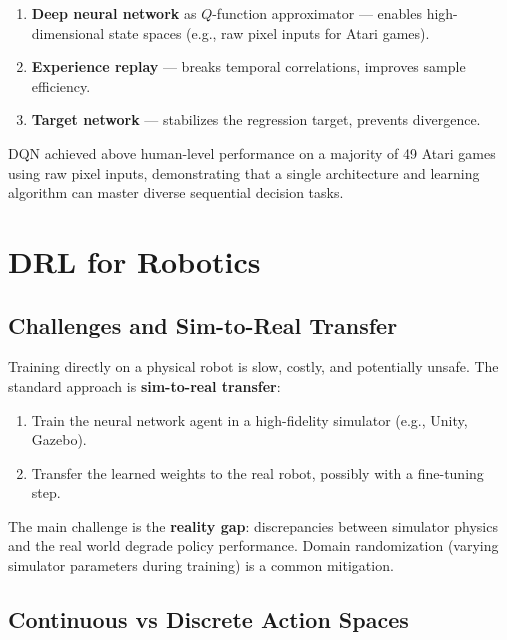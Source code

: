 \documentclass[11pt,a4paper]{article}
\theoremstyle{definition}
\theoremstyle{plain}
\theoremstyle{remark}
\begin{document}
\begin{tcolorbox}[colback=blue!5!white,colframe=blue!75!black,title=\textbf{DQN Key Innovations}]
\begin{enumerate}
    \item \textbf{Deep neural network} as $Q$-function approximator — enables high-dimensional state spaces (e.g., raw pixel inputs for Atari games).
    \item \textbf{Experience replay} — breaks temporal correlations, improves sample efficiency.
    \item \textbf{Target network} — stabilizes the regression target, prevents divergence.
\end{enumerate}
DQN achieved above human-level performance on a majority of 49 Atari games using raw pixel inputs, demonstrating that a single architecture and learning algorithm can master diverse sequential decision tasks.
\end{tcolorbox}

\section{DRL for Robotics}

\subsection{Challenges and Sim-to-Real Transfer}

Training directly on a physical robot is slow, costly, and potentially unsafe. The standard approach is \textbf{sim-to-real transfer}:
\begin{enumerate}
    \item Train the neural network agent in a high-fidelity simulator (e.g., Unity, Gazebo).
    \item Transfer the learned weights to the real robot, possibly with a fine-tuning step.
\end{enumerate}
The main challenge is the \textbf{reality gap}: discrepancies between simulator physics and the real world degrade policy performance. Domain randomization (varying simulator parameters during training) is a common mitigation.

\subsection{Continuous vs Discrete Action Spaces}
\end{document}
